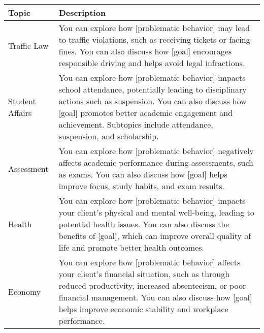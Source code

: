 \begin{table*}[tb]
\centering
\begin{tabularx}{\textwidth}{lX}
\toprule
Topic            & Description                                            \\ \midrule
Traffic Law                 & You can explore how [problematic behavior] may lead to traffic violations, such as receiving tickets or facing fines. You can also discuss how [goal] encourages responsible driving and helps avoid legal infractions.                                                                                                                                                                                                            \\ \hline
Student Affairs             & You can explore how [problematic behavior] impacts school attendance, potentially leading to disciplinary actions such as suspension. You can also discuss how [goal] promotes better academic engagement and achievement. Subtopics include attendance, suspension, and scholarship.                                                                                                                                              \\ \hline
Assessment                  & You can explore how [problematic behavior] negatively affects academic performance during assessments, such as exams. You can also discuss how [goal] helps improve focus, study habits, and exam results.                                                                                                                                                                                                                         \\ \hline
Health                      & You can explore how [problematic behavior] impacts your client's physical and mental well-being, leading to potential health issues. You can also discuss the benefits of [goal], which can improve overall quality of life and promote better health outcomes.                                                                                                                                                                    \\ \hline
Economy                     & You can explore how [problematic behavior] affects your client's financial situation, such as through reduced productivity, increased absenteeism, or poor financial management. You can also discuss how [goal] helps improve economic stability and workplace performance.        \\ \hline

\end{tabularx}
\end{table*}
